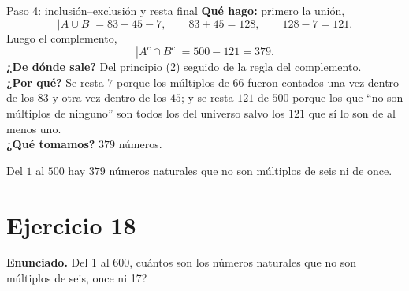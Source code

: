 \documentclass[11pt]{article}
\begin{document}
\begin{sol}
\begin{paso}{Paso 4: inclusi\'on--exclusi\'on y resta final}
\textbf{Qu\'e hago:} primero la uni\'on,
\[
|A\cup B| = 83 + 45 - 7, \qquad 83+45 = 128, \qquad 128 - 7 = 121 .
\]
Luego el complemento,
\[
|A^{c}\cap B^{c}| = 500 - 121 = 379 .
\]
\textbf{¿De d\'onde sale?} Del principio (2) seguido de la regla del complemento.\\
\textbf{¿Por qu\'e?} Se resta $7$ porque los m\'ultiplos de $66$ fueron contados una vez dentro de los $83$ y otra vez dentro de los $45$; y se resta $121$ de $500$ porque los que ``no son m\'ultiplos de ninguno'' son todos los del universo salvo los $121$ que s\'i lo son de al menos uno.\\
\textbf{¿Qu\'e tomamos?} $379$ n\'umeros.
\end{paso}

\end{sol}

\begin{resp}
Del $1$ al $500$ hay $\boxed{379}$ n\'umeros naturales que no son m\'ultiplos de seis ni de once.
\end{resp}

\newpage

\section*{Ejercicio 18}

\textbf{Enunciado.} Del 1 al 600, cu\'antos son los n\'umeros naturales que no son m\'ultiplos de seis, once ni 17?
\end{document}
